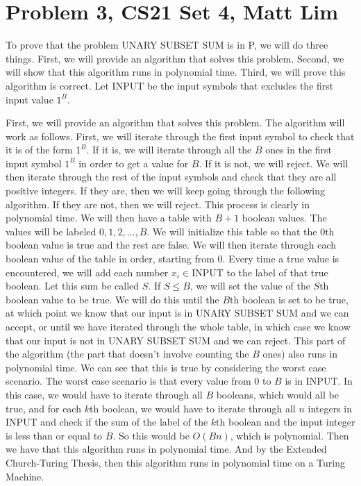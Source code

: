 \documentclass{article}
\begin{document}
\section*{Problem 3, CS21 Set 4, Matt Lim}
To prove that the problem UNARY SUBSET SUM is in P, we will do three things.
First, we will provide an algorithm that solves this problem. Second, we will
show that this algorithm runs in polynomial time. Third, we
will prove this algorithm is correct. Let INPUT be the input symbols that
excludes the first input value $1^{B}$.

First, we will provide an algorithm that solves this problem. The
algorithm will work as follows. First, we will iterate through the first
input symbol to check that it is of the form $1^{B}$. If it is, we will
iterate through all the $B$ ones in the first input symbol $1^{B}$
in order to get a value for $B$. If it is not, we will reject.
We will then iterate through the rest of
the input symbols and check that they are all positive integers. If they are,
then we will keep going through the following algorithm. If they are not, then
we will reject. This process is clearly in polynomial time.
We will then have a table with $B+1$ boolean values.
The values will be labeled $0,1,2,\dots,B$. We will initialize this table so that
the $0$th boolean value is true and the rest are false. We will then iterate
through each boolean value of the table in order, starting from $0$. Every
time a true value is encountered, we will add each number $x_{i} \in
\text{INPUT}$ to the label of that true boolean. Let this sum be called $S$.
If $S \leq B$, we will set the value of the $S$th boolean value to be true.
We will do this until the $B$th boolean is set to be true, at which point we
know that our input is in UNARY SUBSET SUM and we can accept,
or until we have iterated through the whole table, in which case we know that
our input is not in UNARY SUBSET SUM and we can reject.
This part of the algorithm (the part that doesn't involve counting the $B$
ones) also runs in polynomial time. We can see that this is true by considering
the worst case scenario. The worst case scenario is that every value from $0$
to $B$ is in INPUT. In this case, we would have to iterate through all $B$
booleans, which would all be true, and for each $k$th boolean, we would have
to iterate through all $n$ integers in INPUT and check if the sum of the label
of the $k$th boolean and the input integer is less than or equal to $B$. So
this would be $O(Bn)$, which is polynomial. Then we have that this algorithm
runs in polynomial time. And by the Extended Church-Turing Thesis, then this
algorithm runs in polynomial time on a Turing Machine.
\end{document}
